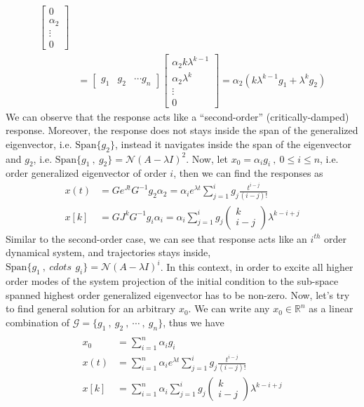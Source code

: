\documentclass[twoside]{article}
\begin{document}
\begin{align*}
%
	\left[ \begin{array}{c} 0 \\ \alpha_2 \\ \vdots \\ 0 \end{array} \right] 
	\\ 
	&= \left[ \begin{array}{ccc} g_1 & g_2 & \cdots g_n \end{array} \right] \left[ \begin{array}{c} \alpha_2 k \lambda^{k-1} \\ \alpha_2 \lambda^k \\ \vdots \\ 0 \end{array} \right] = \alpha_2 \left( k \lambda^{k-1} g_1  + \lambda^k g_2 \right)
\end{align*}
%
We can observe that the response acts like a ``second-order'' (critically-damped) response. Moreover, the response does not stays inside the span of the 
generalized eigenvector, i.e. $\mathrm{Span} \lbrace g_2 \rbrace$, instead it navigates inside the span of the eigenvector and $g_2$, i.e. 
$\mathrm{Span} \lbrace g_1 \ , \ g_2 \rbrace = \mathcal{N}(A - \lambda I)^2$. Now, let $x_0 = \alpha_i g_i \ , \ 0 \leq i \leq n$, i.e. order generalized eigenvector
of order $i$, then we can find the responses as
%
\begin{align*}
x(t) &= G e^{J t} G^{-1} g_2 \alpha_2 = \alpha_i e^{\lambda t} \sum\limits_{j=1}^{i}  g_j \frac{t^{i-j}}{(i-j)!}
\\
x[k] &= G J^k G^{-1} g_i \alpha_i = \alpha_i \sum\limits_{j=1}^{i}  g_j \begin{pmatrix} k \\ i-j \end{pmatrix} \lambda^{k-i+j}  
\end{align*}
%
Similar to the second-order case, we can see that response acts like an $i^{th}$ order dynamical system, and trajectories stays inside,
$\mathrm{Span} \lbrace g_1 \ , \ cdots \, \ g_i \rbrace = \mathcal{N}(A - \lambda I)^i$. In this context, in order to excite all higher order modes 
of the system projection of the initial condition to the sub-space spanned highest order generalized eigenvector has to be non-zero. Now, 
let's try to find general solution for an arbitrary $x_0$. We can write any $x_0 \in \mathbb{R}^{n}$ as a linear combination of 
$\mathcal{G} = \lbrace g_1 \ , \ g_2 \ , \ \cdots \ , \ g_n \rbrace$, thus we have
%
\begin{align*}
\\
x_0 &= \sum\limits_{i=1}^n \alpha_i g_i
\\
x(t) &= \sum\limits_{i=1}^n \alpha_i e^{\lambda t} \sum\limits_{j=1}^{i}  g_j \frac{t^{i-j}}{(i-j)!}
\\
x[k] &= \sum\limits_{i=1}^n \alpha_i \sum\limits_{j=1}^{i}  g_j \begin{pmatrix} k \\ i-j \end{pmatrix} \lambda^{k-i+j}  
\end{align*}
\end{document}
